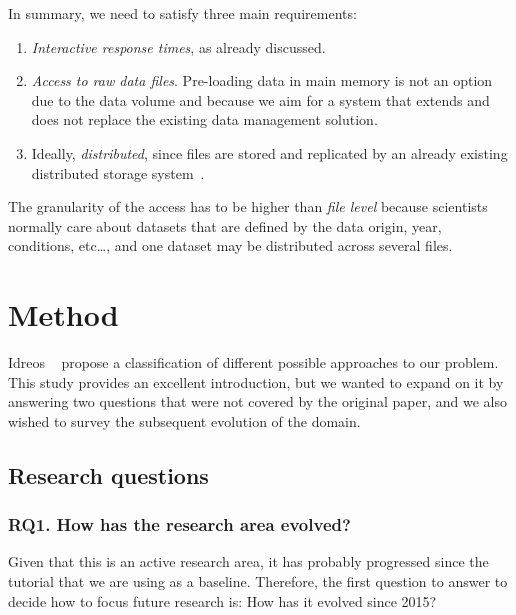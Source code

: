 
In summary, we need to satisfy three main requirements:

\begin{enumerate}
  \item \emph{Interactive response times}, as already discussed.
  \item \emph{Access to raw data files}. Pre-loading data in main memory is not an
    option due to the data volume and because we aim for a system that extends and does
    not replace the existing data management solution.
  \item Ideally, \emph{distributed}, since files are stored and replicated by an already existing
    distributed storage system~\cite{Baud2012}.
\end{enumerate}

The granularity of the access has to be higher than \emph{file level} because
scientists normally care about datasets that are defined by the data origin,
year, conditions, etc\ldots, and one dataset may be distributed across
several files.

\section{Method}
\label{sec:mapping/method}

Idreos \etal~\cite{Idreos2015} propose a classification of different possible approaches
to our problem.
This study provides an excellent introduction, but we wanted to expand on it by answering
two questions that were not covered by the original paper, and we also wished to survey
the subsequent evolution of the domain.

\subsection{Research questions}
\label{sec:mapping/research_questions}

\subsubsection{RQ1. How has the research area evolved?}
Given that this is an active research area, it has probably progressed since
the tutorial that we are using as a baseline. Therefore, the first
question to answer to decide how to focus future research is:
How has it evolved since 2015?

